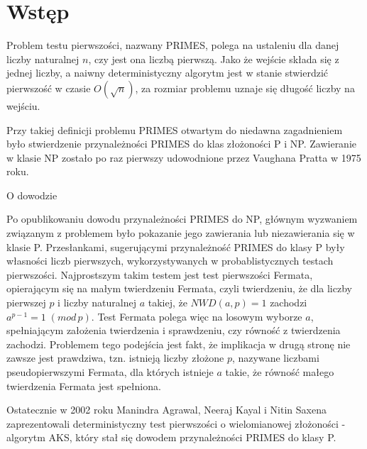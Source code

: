 \documentclass[polish,declaration,shortabstract]{iithesis}
\author         {Martyna Siejba}
\theoremstyle{definition}
\theoremstyle{remark} \newtheorem{observation}{Obserwacja}
\theoremstyle{plain} \newtheorem{theorem}{Twierdzenie}
\theoremstyle{plain} \newtheorem{lemma}{Lemat}
\theoremstyle{remark} \newtheorem*{remark*}{Uwaga}
\theoremstyle{reminder} \newtheorem*{reminder*}{Przypomnienie}
\begin{document}

\chapter{Wstęp}

Problem testu pierwszości, nazwany PRIMES, polega na ustaleniu dla danej liczby naturalnej $n$, czy jest ona liczbą pierwszą. Jako że wejście składa się z jednej liczby, a naiwny deterministyczny algorytm jest w stanie stwierdzić pierwszość w czasie $O(\sqrt{n})$, za rozmiar problemu uznaje się długość liczby na wejściu.

Przy takiej definicji problemu PRIMES otwartym do niedawna zagadnieniem było stwierdzenie przynależności PRIMES do klas złożoności P i NP. Zawieranie w klasie NP zostało po raz pierwszy udowodnione przez Vaughana Pratta w 1975 roku. 

O dowodzie

Po opublikowaniu dowodu przynależności PRIMES do NP, głównym wyzwaniem związanym z problemem było pokazanie jego zawierania lub niezawierania się w klasie P. Przesłankami, sugerującymi przynależność PRIMES do klasy P były własności liczb pierwszych, wykorzystywanych w probablistycznych testach pierwszości. Najprostszym takim testem jest test pierwszości Fermata, opierającym się na małym twierdzeniu Fermata, czyli twierdzeniu, że dla liczby pierwszej $p$ i liczby naturalnej $a$ takiej, że $NWD(a, p) = 1$ zachodzi $a^{p-1} = 1 \; (mod \, p)$. Test Fermata polega więc na losowym wyborze $a$, spełniającym założenia twierdzenia i sprawdzeniu, czy równość z twierdzenia zachodzi. Problemem tego podejścia jest fakt, że implikacja w drugą stronę nie zawsze jest prawdziwa, tzn. istnieją liczby złożone $p$, nazywane liczbami pseudopierwszymi Fermata, dla których istnieje $a$ takie, że równość małego twierdzenia Fermata jest spełniona. 



Ostatecznie w 2002 roku Manindra Agrawal, Neeraj Kayal i Nitin Saxena zaprezentowali deterministyczny test pierwszości o wielomianowej złożoności - algorytm AKS, który stał się dowodem przynależności PRIMES do klasy P.
\end{document}
